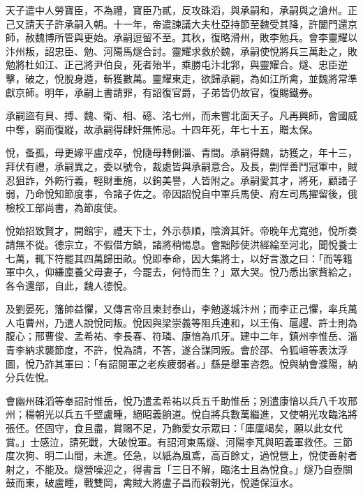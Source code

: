 \begin{pinyinscope}
 天子遣中人勞寶臣，不為禮，寶臣乃貳，反攻硃滔，與承嗣和，承嗣與之滄州。正己又請天子許承嗣入朝。十一年，帝遣諫議大夫杜亞持節至魏受其降，許闔門還京師，赦魏博所管與更始。承嗣逗留不至。其秋，復略滑州，敗李勉兵。會李靈耀以汴州叛，詔忠臣、勉、河陽馬燧合討。靈耀求救於魏，承嗣使悅將兵三萬赴之，敗勉將杜如江、正己將尹伯良，死者殆半，乘勝屯汴北郛，與靈耀合。燧、忠臣逆擊，破之，悅脫身遁，斬獲數萬。靈耀東走，欲歸承嗣，為如江所禽，並魏將常準獻京師。明年，承嗣上書請罪，有詔復官爵，子弟皆仍故官，復賜鐵券。



 承嗣盜有貝、搏、魏、衛、相、礠、洺七州，而未嘗北面天子。凡再興師，會國威中奪，窮而復縱，故承嗣得肆奸無怖忌。十四年死，年七十五，贈太保。



 悅，蚤孤，母更嫁平盧戍卒，悅隨母轉側淄、青間。承嗣得魏，訪獲之，年十三，拜伏有禮，承嗣異之，委以號令，裁處皆與承嗣意合。及長，剽悍善鬥冠軍中，賊忍狙詐，外飭行義，輕財重施，以鉤美譽，人皆附之。承嗣愛其才，將死，顧諸子弱，乃命悅知節度事，令諸子佐之。帝因詔悅自中軍兵馬使、府左司馬擢留後，俄檢校工部尚書，為節度使。



 悅始招致賢才，開館宇，禮天下士，外示恭順，陰濟其奸。帝晚年尤寬弛，悅所奏請無不從。德宗立，不假借方鎮，諸將稍惕息。會黜陟使洪經綸至河北，聞悅養士七萬，輒下符罷其四萬歸田畝。悅即奉命，因大集將士，以好言激之曰：「而等籍軍中久，仰縑廩養父母妻子，今罷去，何恃而生？」眾大哭。悅乃悉出家貲給之，各令還部，自此，魏人德悅。



 及劉晏死，籓帥益懼，又傳言帝且東封泰山，李勉遂城汴州；而李正己懼，率兵萬人屯曹州，乃遣人說悅同叛。悅因與梁崇義等阻兵連和，以王侑、扈趯、許士則為腹心；邢曹俊、孟希祐、李長春、符璘、康愔為爪牙。建中二年，鎮州李惟岳、淄青李納求襲節度，不許，悅為請，不答，遂合謀同叛。會於邵、令狐峘等表汰浮圖，悅乃詐其軍曰：「有詔閱軍之老疾疲弱者。」繇是舉軍咨怨。悅與納會濮陽，納分兵佐悅。



 會幽州硃滔等奉詔討惟岳，悅乃遣孟希祐以兵五千助惟岳；別遣康愔以兵八千攻邢州；楊朝光以兵五千壁盧畽，絕昭義餉道。悅自將兵數萬繼進，又使朝光攻臨洺將張伾。伾固守，食且盡，賞賜不足，乃飾愛女示眾曰：「庫廩竭矣，願以此女代賞。」士感泣，請死戰，大破悅軍。有詔河東馬燧、河陽李芃與昭義軍救伾。三節度次狗、明二山間，未進。伾急，以紙為風鳶，高百餘丈，過悅營上，悅使善射者射之，不能及。燧營噪迎之，得書言「三日不解，臨洺士且為悅食。」燧乃自壺關鼓而東，破盧畽，戰雙岡，禽賊大將盧子昌而殺朝光，悅遁保洹水。




\end{pinyinscope}
